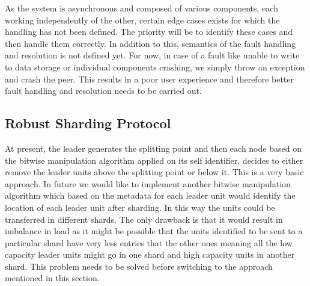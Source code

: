 \documentclass[12pt,a4paper,twoside,openright]{book}
\begin{document}
As the system is asynchronous and composed of various components, each working independently of the other, certain edge cases exists for which the handling has not been defined. The priority will be to identify these cases and then handle them correctly. In addition to this, semantics of the fault handling and resolution is not defined yet. For now, in case of a fault like unable to write to data storage or individual components crashing, we simply throw an exception and crash the peer. This results in a poor user experience and therefore better fault handling and resolution needs to be carried out.


\subsection{Robust Sharding Protocol}
At present, the leader generates the splitting point and then each node based on the bitwise manipulation algorithm applied on its self identifier, decides to either remove the leader units above the splitting point or below it. This is a very basic approach. In future we would like to implement another bitwise manipulation algorithm which based on the metadata for each leader unit would identify the location of each leader unit after sharding. In this way the units could be transferred in different shards. The only drawback is that it would result in imbalance in load as it might be possible that the units identified to be sent to a particular shard have very less entries that the other ones meaning all the low capacity leader units might go in one shard and high capacity units in another shard. This problem needs to be solved before switching to the approach mentioned in this section.






\appendix

\end{document}
